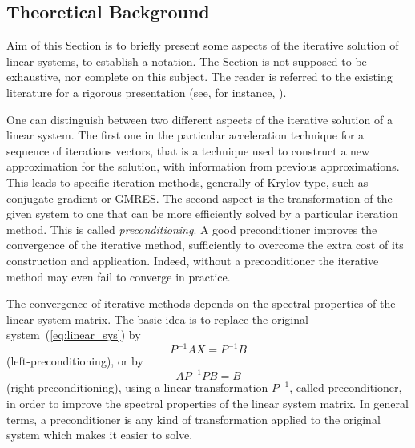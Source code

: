 
\subsection{Theoretical Background}
\label{aztecoo:theoretical}

Aim of this Section is to briefly present some aspects of the iterative
solution of linear systems, to establish a notation. The Section is not
supposed to be exhaustive, nor complete on this subject. The reader is
referred to the existing literature for a rigorous presentation (see,
for instance, \cite{axelsson94iterative,saad96iterative}).

\medskip

One can distinguish between two different aspects of the iterative
solution of a linear system. The first one in the particular
acceleration technique for a sequence of iterations vectors, that is a
technique used to construct a new approximation for the solution, with
information from previous approximations.  This leads to specific
iteration methods, generally of Krylov type, such as conjugate gradient
or GMRES. The second aspect is the transformation of the given system to
one that can be more efficiently solved by a particular iteration
method. This is called {\em preconditioning}.  A good preconditioner
improves the convergence of the iterative method, sufficiently to
overcome the extra cost of its construction and application. Indeed,
without a preconditioner the iterative method may even fail to converge
in practice.

The convergence of iterative methods depends on the spectral properties
of the linear system matrix. The basic idea is to replace the original
system~(\ref{eq:linear_sys}) by
\[
P^{-1} A X = P^{-1} B
\]
(left-preconditioning), or by
\[
A P^{-1} P B = B
\]
(right-preconditioning), using a linear transformation $P^{-1}$,
called preconditioner, in order to improve the spectral properties of
the linear system matrix. In general terms, a preconditioner is any
kind of transformation applied to the original system which makes it
easier to solve.

